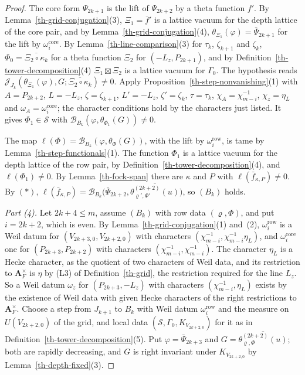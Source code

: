 \begin{proof}
The core form $\Psi_{2k+1}$ is the lift of $\Psi_{2k+2}$ by a theta function
$f'$. By Lemma~\ref{th-grid-conjugation}(3), $\Xi_1=\bar f'$ is a lattice vacuum
for the depth lattice of the core pair, and by
Lemma~\ref{th-grid-conjugation}(4), $\theta_{\Xi_1}(\varphi)=\bar\Psi_{2k+1}$
for the lift by $\omega^{\mathrm{core}}_i$. By
Lemma~\ref{th-line-comparison}(3) for $\tau_k$, $\zeta_{k+1}$ and $\zeta_k$,
$\Phi_0=\overline{\Xi_2\circ\kappa_k}$ for a theta function $\Xi_2$ for
$(-L_z,P_{2k+1})$, and by Definition~\ref{th-tower-decomposition}(4)
$\Xi_1\boxtimes\Xi_2$ is a lattice vacuum for $\Gamma_0$. The hypothesis reads
$\mathcal J_{J_k}(\theta_{\Xi_1}(\varphi),G;\overline{\Xi_2\circ\kappa_k})\neq0$.
Apply Proposition~\ref{th-step-nonvanishing}(1) with $A=P_{2k+2}$, $L=-L_z$,
$\zeta=\zeta_{k+1}$, $L'=-L_z$, $\zeta'=\zeta_k$, $\tau=\tau_k$,
$\chi_A=\chi_{m-i}^{-1}$, $\chi_z=\eta_L$ and
$\omega_A=\omega^{\mathrm{core}}_i$; the character conditions hold by the
characters just listed. It gives $\Phi_1\in\mathcal S$ with
$\mathcal B_{B_k}(\varphi,\theta_{\Phi_1}(G))\neq0$.

The map $\ell(\Phi)=\mathcal B_{B_k}(\varphi,\theta_\Phi(G))$, with the lift by
$\omega^{\mathrm{row}}_i$, is tame by Lemma~\ref{th-step-functionals}(1). The
function $\Phi_1$ is a lattice vacuum for the depth lattice of the row pair, by
Definition~\ref{th-tower-decomposition}(4), and $\ell(\Phi_1)\neq0$. By
Lemma~\ref{th-fock-span} there are $\kappa$ and $P$ with
$\ell(\bar f_{\kappa,P})\neq0$. By $(*)$,
$\ell(\bar f_{\kappa,P})=\mathcal B_{B_k}\bigl(\bar\Psi_{2k+2},\overline{\theta^{(2k+2)}_{\varrho',\Phi'}(u)}\bigr)$,
so $(B_k)$ holds.

\emph{Part (4).} Let $2k+4\leq m$, assume $(B_k)$ with row data
$(\varrho,\Phi)$, and put $i=2k+2$, which is even. By
Lemma~\ref{th-grid-conjugation}(1) and~(2), $\omega^{\mathrm{row}}_i$ is a Weil
datum for $(V_{2k+3,0},V_{2k+2,0})$ with characters
$(\chi_{m-i}^{-1},\chi_{m-i}^{-1}\eta_L)$, and $\omega^{\mathrm{core}}_i$ one
for $(P_{2k+3},P_{2k+2})$ with characters $(\chi_{m-i}^{-1},\chi_{m-i}^{-1})$.
The character $\eta_L$ is a Hecke character, as the quotient of two characters
of Weil data, and its restriction to $\mathbf A_F^\times$ is $\eta$ by (L3) of
Definition~\ref{th-grid}, the restriction required for the line $L_z$. So a
Weil datum $\omega_z$ for $(P_{2k+3},-L_z)$ with characters
$(\chi_{m-i}^{-1},\eta_L)$ exists by the existence of Weil data with given Hecke
characters of the right restrictions to $\mathbf A_F^\times$. Choose a step
from $J_{k+1}$ to $B_k$ with Weil datum $\omega^{\mathrm{row}}_i$ and the measure
on $U(V_{2k+2,0})$ of the grid, and local data
$(\mathcal S,\Gamma_0,K_{V_{2k+2,0}})$ for it as in
Definition~\ref{th-tower-decomposition}(5). Put $\varphi=\bar\Psi_{2k+3}$ and
$G=\overline{\theta^{(2k+2)}_{\varrho,\Phi}(u)}$; both are rapidly decreasing,
and $G$ is right invariant under $K_{V_{2k+2,0}}$ by
Lemma~\ref{th-depth-fixed}(3).


\end{proof}
